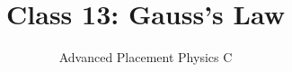 \documentclass[12pt,aspectratio=169]{beamer}
\title{Class 13: Gauss's Law}
\subtitle{Advanced Placement Physics C}
\begin{document}
\begin{frame}
  \maketitle
\end{frame}


%
%
%
%
%
\end{document}
